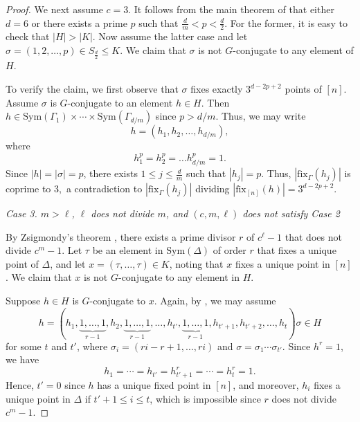 \documentclass[twoside,a4paper,reqno,11pt]{amsart}
\newcommand{\<}{\langle}
\renewcommand{\>}{\rangle}
\newcommand{\leqs}{\leqslant}
\newcommand{\vs}{\vspace{2mm}}
\newcommand{\fix}{\mathrm{fix}}
\def\Sym{\mathrm{Sym}}
\theoremstyle{definition}
\begin{document}
\begin{proof}
		We next assume $c=3$. It follows from the main theorem of \cite{N_prime} that either $d=6$ or there exists a prime $p$ such that $\frac{d}{m}<p<\frac{d}{2}$. For the former, it is easy to check that $|H|>|K|.$ 
		Now assume the latter case and let $\sigma=(1,2,\dots, p)\in S_{\frac{d}{2}}\leqs K$. We claim that $\sigma$ is not $G$-conjugate to any element of $H.$
		
		To verify the claim, we first observe that $\sigma$ fixes exactly $3^{d-2p+2}$ points of $[n]$.  Assume $\sigma$ is $G$-conjugate to an element $h\in H$. Then $h\in \Sym(\Gamma_1)\times \cdots \times \Sym(\Gamma_{d/m})$ since $p > d/m$. Thus, we may write 
		\begin{equation*}
		h=(h_1,h_2,\dots, h_{d/m}),
		\end{equation*}
		where
		\begin{equation*}
		h_1^p=h_2^p=\dots h_{d/m}^p=1.
		\end{equation*}
		Since $|h| = |\sigma| = p$, there exists $1\leqs j \leqs \frac{d}{m}$ such that $|h_j|=p.$
		Thus, $|\fix_{\Gamma}(h_j)|$ is coprime to $3,$ a contradiction to $|\fix_{\Gamma}(h_j)|$ dividing $|\fix_{[n]}(h)|=3^{d-2p+2}.$
		
		\vs
		
		\noindent \emph{Case 3. $m > \ell$, $\ell$ does not divide $m$, and $(c,m,\ell)$ does not satisfy Case 2}
		
		\vs
		
		By Zsigmondy's theorem \cite{Z_ppd}, there exists a prime divisor $r$ of $c^\ell-1$ that does not divide $c^m-1$. Let $\tau$ be an element in $\mathrm{Sym}(\Delta)$ of order $r$ that fixes a unique point of $\Delta$, and let $x = (\tau,\dots,\tau)\in K$, noting that $x$ fixes a unique point in $[n]$. We claim that $x$ is not $G$-conjugate to any element in $H$.
		
		Suppose $h\in H$ is $G$-conjugate to $x$. Again, by \cite[Proposition 2.1]{CH_conju}, we may assume
		\begin{equation*}
		h = (h_1,\underbrace{1,\dots, 1}_{r-1},h_2,\underbrace{1, \dots, 1}_{r-1},\dots, h_{t'},\underbrace{1, \dots, 1}_{r-1},h_{t'+1},h_{t'+2},\dots, h_{t})\sigma\in H
		\end{equation*}
		for some $t$ and $t'$, where $\sigma_i = (ri-r+1,\dots,ri)$ and $\sigma = \sigma_1\cdots\sigma_{t'}$. Since $h^r = 1$, we have
		\begin{equation*}
		h_1 = \cdots = h_{t'} = h_{t'+1}^r = \cdots = h_t^r = 1.
		\end{equation*}
		Hence, $t' = 0$ since $h$ has a unique fixed point in $[n]$, and moreover, $h_i$ fixes a unique point in $\Delta$ if $t'+1\leqs i\leqs t$, which is impossible since $r$ does not divide $c^m-1$.
		

\end{proof}
\end{document}
